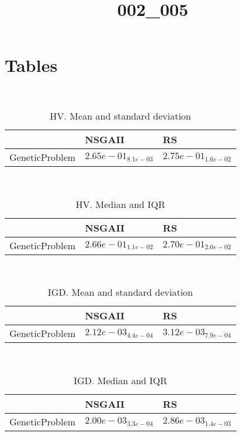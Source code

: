 \documentclass{article}
\title{002_005}
\author{}
\begin{document}
\maketitle
\section{Tables}
\
\begin{table}
\caption{HV. Mean and standard deviation}
\label{table:mean.HV}
\centering
\begin{scriptsize}
\begin{tabular}{lll}
\hline & NSGAII &  RS\\
\hline
GeneticProblem & \cellcolor{gray25}$  2.65e-01_{ 8.1e-03}$ & \cellcolor{gray95}$  2.75e-01_{ 1.6e-02}$ \\
\hline
\end{tabular}
\end{scriptsize}
\end{table}
\
\begin{table}
\caption{HV. Median and IQR}
\label{table:median.HV}
\begin{scriptsize}
\centering
\begin{tabular}{lll}
\hline & NSGAII &  RS\\
\hline
GeneticProblem & \cellcolor{gray25}$  2.66e-01_{ 1.1e-02}$ & \cellcolor{gray95}$  2.70e-01_{ 2.0e-02}$ \\
\hline
\end{tabular}
\end{scriptsize}
\end{table}
\
\begin{table}
\caption{IGD. Mean and standard deviation}
\label{table:mean.IGD}
\centering
\begin{scriptsize}
\begin{tabular}{lll}
\hline & NSGAII &  RS\\
\hline
GeneticProblem & \cellcolor{gray95}$  2.12e-03_{ 4.4e-04}$ & $  3.12e-03_{ 7.9e-04}$ \\
\hline
\end{tabular}
\end{scriptsize}
\end{table}
\
\begin{table}
\caption{IGD. Median and IQR}
\label{table:median.IGD}
\begin{scriptsize}
\centering
\begin{tabular}{lll}
\hline & NSGAII &  RS\\
\hline
GeneticProblem & \cellcolor{gray95}$  2.00e-03_{ 3.3e-04}$ & $  2.86e-03_{ 1.4e-03}$ \\
\hline
\end{tabular}
\end{scriptsize}
\end{table}
\end{document}
